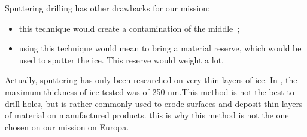 Sputtering drilling has other drawbacks for our mission:
\begin{itemize}
\item{this technique would create a contamination of the middle~;}
\item{using this technique would mean to bring a material reserve, which would be used to sputter the ice. This reserve would weight a lot.}
\end{itemize}

Actually, sputtering has only been researched on very thin layers of ice. In \cite{baragiola2003sputtering}, the maximum thickness of ice tested was of 250 nm.This method is not the best to drill holes, but is rather commonly used to erode surfaces and deposit thin layers of material on manufactured products. this is why this method is not the one chosen on our mission on Europa.